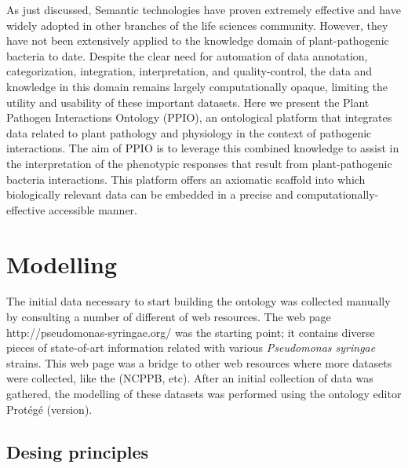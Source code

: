 \documentclass[sw]{iosart2c}
\begin{document}
As just discussed, Semantic technologies have proven extremely effective and have widely adopted in other branches of the life sciences community. However, they have not been extensively applied to the knowledge domain of plant-pathogenic bacteria to date. Despite the clear need for automation of data annotation, categorization, integration, interpretation, and quality-control, the data and knowledge in this domain remains largely computationally opaque, limiting the utility and usability of these important datasets. Here we present the Plant Pathogen Interactions Ontology (PPIO), an ontological platform that integrates data related to plant pathology and physiology in the context of pathogenic interactions. The aim of PPIO is to leverage this combined knowledge to assist in the interpretation of the phenotypic responses that result from plant-pathogenic bacteria interactions. This platform offers an axiomatic scaffold into which biologically relevant data can be embedded in a precise and computationally-effective accessible manner. 




\section{Modelling}

The initial data necessary to start building the ontology was collected manually by consulting a number of different of web resources. The web page http://pseudomonas-syringae.org/ was the starting point; it contains diverse pieces of state-of-art information related with various {\itshape Pseudomonas syringae} strains. This web page was a bridge to other web resources where more datasets were collected, like the (NCPPB, etc). After an initial collection of data was gathered, the modelling of these datasets was performed using the ontology editor Prot\'eg\'e (version). 

\subsection{Desing principles}
\end{document}
